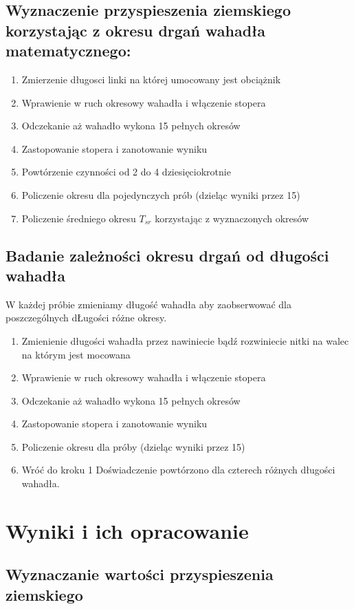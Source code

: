 \documentclass [a4paper,11pt]{article}
\begin{document}
 \subsection{Wyznaczenie przyspieszenia ziemskiego korzystając z okresu drgań wahadła matematycznego:}
\begin{enumerate}
\item Zmierzenie długosci linki na której umocowany jest obciążnik
\item Wprawienie w ruch okresowy wahadła i włączenie stopera
\item Odczekanie aż wahadło wykona 15 pełnych okresów 
\item Zastopowanie stopera i zanotowanie wyniku
\item Powtórzenie czynności od 2 do 4 dziesięciokrotnie
\item Policzenie okresu dla pojedynczych prób (dzieląc wyniki przez 15)
\item Policzenie średniego okresu $T_{sr}$ korzystając z wyznaczonych okresów
\end{enumerate}

 \subsection{Badanie zależności okresu drgań od długości wahadła}
\indent W każdej próbie zmieniamy długość wahadła aby zaobserwować dla poszczególnych dŁugości różne okresy.
\begin{enumerate}
\item Zmienienie długości wahadła przez nawiniecie bądź rozwiniecie nitki na walec na którym jest mocowana
\item Wprawienie w ruch okresowy wahadła i włączenie stopera
\item Odczekanie aż wahadło wykona 15 pełnych okresów 
\item Zastopowanie stopera i zanotowanie wyniku
\item Policzenie okresu dla próby (dzieląc wyniki przez 15)  
\item Wróć do kroku 1
\indent Doświadczenie powtórzono dla czterech różnych długości wahadła.
\end{enumerate}

\section{Wyniki i ich opracowanie}
\subsection{Wyznaczanie wartości przyspieszenia ziemskiego}
\end{document}
